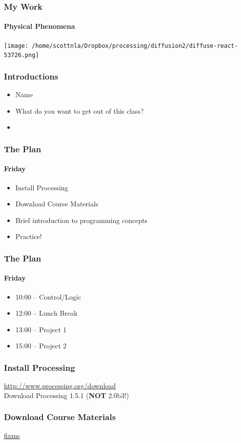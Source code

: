 \documentclass[xcolor=dvipsnames]{beamer}
\begin{document}
\begin{frame}
\frametitle{My Work}
\framesubtitle{Physical Phenomena}
\begin{center}
\texttt{[image: /home/scottnla/Dropbox/processing/diffusion2/diffuse-react-53726.png]}
\end{center}
\end{frame}

\begin{frame}
\frametitle{Introductions}
\begin{itemize}
\item Name
\item What do you want to get out of this class?
\item 
\end{itemize}
\end{frame}

\begin{frame}
\frametitle{The Plan}
\framesubtitle{Friday}
\begin{itemize}
\item Install Processing
\item Download Course Materials
\item Brief introduction to programming concepts
\item Practice!
\end{itemize}
\end{frame}

\begin{frame}
\frametitle{The Plan}
\framesubtitle{Friday}
\begin{itemize}
\item 10:00 -- Control/Logic
\item 12:00 -- Lunch Break
\item 13:00 -- Project 1
\item 15:00 -- Project 2
\end{itemize}
\end{frame}

\begin{frame}
\frametitle{Install Processing}
\begin{center}
\url{http://www.processing.org/download} \\
Download Processing 1.5.1 (\textbf{NOT} 2.0b3!)
\end{center}
\end{frame}

\begin{frame}
\frametitle{Download Course Materials}
\begin{center}
\url{fixme}
\end{center}
\end{frame}
\end{document}
